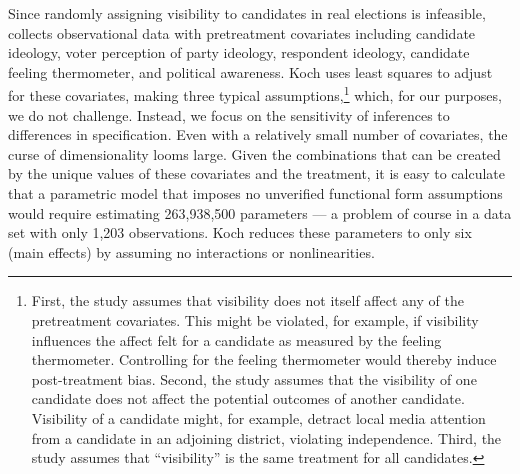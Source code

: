 \documentclass[11pt,titlepage]{article}
\begin{document}
Since randomly assigning visibility to candidates in real elections is
infeasible, \citet{Koch02} collects observational data with
pretreatment covariates including candidate ideology, voter perception
of party ideology, respondent ideology, candidate feeling thermometer,
and political awareness.  Koch uses least squares to adjust for these
covariates, making three typical assumptions,\footnote{First, the
  study assumes that visibility does not itself affect any of the
  pretreatment covariates.  This might be violated, for example, if
  visibility influences the affect felt for a candidate as measured by
  the feeling thermometer.  Controlling for the feeling thermometer
  would thereby induce post-treatment bias.  Second, the study assumes
  that the visibility of one candidate does not affect the potential
  outcomes of another candidate.  Visibility of a candidate might, for
  example, detract local media attention from a candidate in an
  adjoining district, violating independence.  Third, the study
  assumes that ``visibility'' is the same treatment for all
  candidates.}  which, for our purposes, we do not challenge.
Instead, we focus on the sensitivity of inferences to differences in
specification.  Even with a relatively small number of covariates, the
curse of dimensionality looms large.  Given the combinations that can
be created by the unique values of these covariates and the treatment,
it is easy to calculate that a parametric model that imposes no
unverified functional form assumptions would require estimating
263,938,500 parameters --- a problem of course in a data set with only
1,203 observations.  Koch reduces these parameters to only six (main
effects) by assuming no interactions or nonlinearities.
\end{document}
